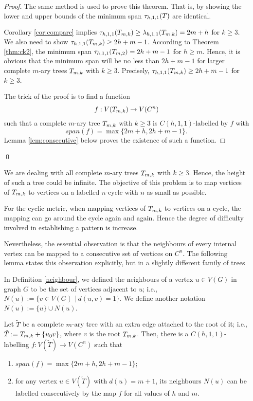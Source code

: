 \begin{proof}
The same method is used to prove this theorem. That is, by showing the lower and upper bounds of the minimum span $\tau_{h,1,1}(T)$ are identical.   

Corollary \ref{cor:compare} implies $\tau_{h,1,1}(T_{m,k}) \ge \lambda_{h,1,1}(T_{m,k}) = 2m+h$ for $k \ge 3$. We also need to show $\tau_{h,1,1}(T_{m,k}) \ge 2h+m-1$. According to Theorem \ref{thm:ck2}, the minimum span $\t_{h,1,1}(\tm2) = 2h+m-1$ for $h \ge m$. Hence, it is obvious that the minimum span will be no less than $2h+m-1$ for larger complete $m$-ary trees $T_{m,k}$ with $k \ge 3$. Precisely, $\tau_{h,1,1}(T_{m,k}) \ge 2h+m-1$ for $k \ge 3$.   

The trick of the proof is to find a function $$f:V(T_{m,k}) \rightarrow V(C^n)$$ such that a complete $m$-ary tree $T_{m,k}$ with $k \ge 3$ is $C(h,1,1)$-labelled by $f$ with
\[
span(f) =  \max\{2m+h, 2h+m-1\}.
\]
Lemma \ref{lem:consecutive} below proves the existence of such a function. 
\end{proof}
\qed

We are dealing with all complete $m$-ary trees $T_{m,k}$ with $k \ge 3$. Hence, the height of such a tree could be infinite. The objective of this problem is to map vertices of $T_{m,k}$ to vertices on a labelled $n$-cycle with $n$ as small as possible. 

For the cyclic metric, when mapping vertices of $T_{m,k}$ to vertices on a cycle, the mapping can go around the cycle again and again. Hence the degree of difficulty involved in establishing a pattern is increase.  

Nevertheless, the essential observation is that the neighbours of every internal vertex can be mapped to a consecutive set of vertices on $C^n$. The following lemma states this observation explicitly, but in a slightly different family of trees

In Definition \ref{neighbour}, we defined the neighbours of a vertex $u \in V(G)$ in graph $G$ to be the set of vertices adjacent to $u$; i.e.,  $N(u) := \{v \in V(G) \mid d(u,v) = 1\}$. We define another notation $\overline{N(u)} :=\{u\} \cup N(u)$.

\begin{lemma}
\label{lem:consecutive}
Let $\tilde{T}$ be a complete $m$-ary tree with an extra edge attached to the root of it; i.e.,  $\tilde{T} := T_{m,k} +\{u_0v\}$, where $v$ is the root $T_{m,k}$. Then, there is a $C(h,1,1)$-labelling $f: V(\tilde{T}) \rightarrow V(C^n)$ such that 
\begin{enumerate}[(1)] 
\item $span(f) = \max\{2m+h, 2h+m-1\}$;
\item for any vertex $u \in V(\tilde{T})$ with $d(u) = m+1$, its neighbours $N(u)$ can be labelled consecutively by the map $f$ for all values of $h$ and $m$.   
\end{enumerate}
\end{lemma}   

